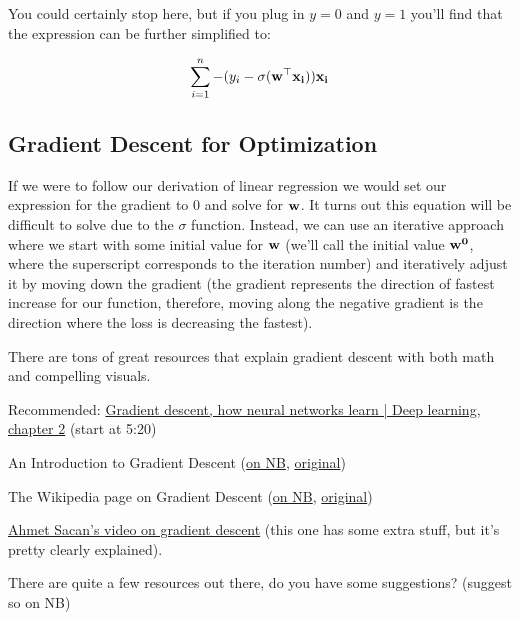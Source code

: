 \documentclass[assignment04_Solutions]{subfiles}
\begin{document}
\begin{exercise}[(60 minutes)]
\begin{boxedsolution}
You could certainly stop here, but if you plug in $y=0$ and $y=1$ you'll find that the expression can be further simplified to:
 
 \begin{align}
\sum_{i=1}^n  -(y_i - \sigma(\mathbf{w}^\top \mathbf{x_i})) \mathbf{x_i} \nonumber
 \end{align}


\end{boxedsolution}

\ees
\end{exercise}


\subsection{Gradient Descent for Optimization}
If we were to follow our derivation of linear regression we would set our expression for the gradient to 0 and solve for $\mathbf{w}$.  It turns out this equation will be difficult to solve due to the $\sigma$ function.  Instead, we can use an iterative approach where we start with some initial value for $\mathbf{w}$ (we'll call the initial value $\mathbf{w^0}$, where the superscript corresponds to the iteration number) and iteratively adjust it by moving down the gradient (the gradient represents the direction of fastest increase for our function, therefore, moving along the negative gradient is the direction where the loss is decreasing the fastest).

\vspace{1em}
\begin{externalresources}[(45 minutes)]
There are tons of great resources that explain gradient descent with both math and compelling visuals.
\bi
\item Recommended: \href{https://www.youtube.com/watch?v=IHZwWFHWa-w}{Gradient descent, how neural networks learn | Deep learning, chapter 2} (start at 5:20)
\item An Introduction to Gradient Descent (\href{http://nb.mit.edu/f/55231}{on NB}, \href{https://medium.com/@viveksingh.heritage/an-introduction-to-gradient-descent-54775b55ba4f}{original})
\item The Wikipedia page on Gradient Descent (\href{http://nb.mit.edu/f/55232}{on NB}, \href{https://en.wikipedia.org/wiki/Gradient_descent}{original})
\item \href{https://www.youtube.com/watch?v=fPSPdTjINi0}{Ahmet Sacan's video on gradient descent} (this one has some extra stuff, but it's pretty clearly explained).
\item There are quite a few resources out there, do you have some suggestions? (suggest so on NB)
\ei 
\end{externalresources}
\end{document}
